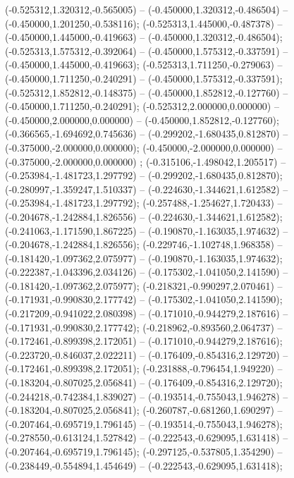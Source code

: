  (-0.525312,1.320312,-0.565005) -- (-0.450000,1.320312,-0.486504) -- (-0.450000,1.201250,-0.538116);
 (-0.525313,1.445000,-0.487378) -- (-0.450000,1.445000,-0.419663) -- (-0.450000,1.320312,-0.486504);
 (-0.525313,1.575312,-0.392064) -- (-0.450000,1.575312,-0.337591) -- (-0.450000,1.445000,-0.419663);
 (-0.525313,1.711250,-0.279063) -- (-0.450000,1.711250,-0.240291) -- (-0.450000,1.575312,-0.337591);
 (-0.525312,1.852812,-0.148375) -- (-0.450000,1.852812,-0.127760) -- (-0.450000,1.711250,-0.240291);
 (-0.525312,2.000000,0.000000) -- (-0.450000,2.000000,0.000000) -- (-0.450000,1.852812,-0.127760);
 (-0.366565,-1.694692,0.745636) -- (-0.299202,-1.680435,0.812870) -- (-0.375000,-2.000000,0.000000);
 (-0.450000,-2.000000,0.000000) -- (-0.375000,-2.000000,0.000000) ;
 (-0.315106,-1.498042,1.205517) -- (-0.253984,-1.481723,1.297792) -- (-0.299202,-1.680435,0.812870);
 (-0.280997,-1.359247,1.510337) -- (-0.224630,-1.344621,1.612582) -- (-0.253984,-1.481723,1.297792);
 (-0.257488,-1.254627,1.720433) -- (-0.204678,-1.242884,1.826556) -- (-0.224630,-1.344621,1.612582);
 (-0.241063,-1.171590,1.867225) -- (-0.190870,-1.163035,1.974632) -- (-0.204678,-1.242884,1.826556);
 (-0.229746,-1.102748,1.968358) -- (-0.181420,-1.097362,2.075977) -- (-0.190870,-1.163035,1.974632);
 (-0.222387,-1.043396,2.034126) -- (-0.175302,-1.041050,2.141590) -- (-0.181420,-1.097362,2.075977);
 (-0.218321,-0.990297,2.070461) -- (-0.171931,-0.990830,2.177742) -- (-0.175302,-1.041050,2.141590);
 (-0.217209,-0.941022,2.080398) -- (-0.171010,-0.944279,2.187616) -- (-0.171931,-0.990830,2.177742);
 (-0.218962,-0.893560,2.064737) -- (-0.172461,-0.899398,2.172051) -- (-0.171010,-0.944279,2.187616);
 (-0.223720,-0.846037,2.022211) -- (-0.176409,-0.854316,2.129720) -- (-0.172461,-0.899398,2.172051);
 (-0.231888,-0.796454,1.949220) -- (-0.183204,-0.807025,2.056841) -- (-0.176409,-0.854316,2.129720);
 (-0.244218,-0.742384,1.839027) -- (-0.193514,-0.755043,1.946278) -- (-0.183204,-0.807025,2.056841);
 (-0.260787,-0.681260,1.690297) -- (-0.207464,-0.695719,1.796145) -- (-0.193514,-0.755043,1.946278);
 (-0.278550,-0.613124,1.527842) -- (-0.222543,-0.629095,1.631418) -- (-0.207464,-0.695719,1.796145);
 (-0.297125,-0.537805,1.354290) -- (-0.238449,-0.554894,1.454649) -- (-0.222543,-0.629095,1.631418);
